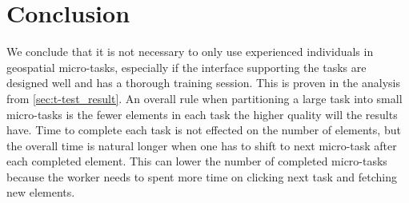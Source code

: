 \chapter{Conclusion}

We conclude that it is not necessary to only use experienced individuals in geospatial micro-tasks, especially if the interface supporting the tasks are designed well and has a thorough training session. This is proven in the analysis from \ref{sec:t-test_result}. An overall rule when partitioning a large task into small micro-tasks is the fewer elements in each task the higher quality will the results have. Time to complete each task is not effected on the number of elements, but the overall time is natural longer when one has to shift to next micro-task after each completed element. This can lower the number of completed micro-tasks because the worker needs to spent more time on clicking next task and fetching new elements. 